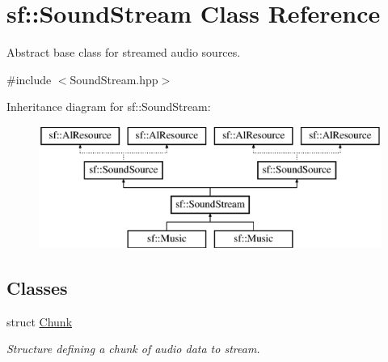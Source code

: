 \hypertarget{classsf_1_1_sound_stream}{\section{sf\-:\-:Sound\-Stream Class Reference}
\label{classsf_1_1_sound_stream}
}


Abstract base class for streamed audio sources.  




{\ttfamily \#include $<$Sound\-Stream.\-hpp$>$}

Inheritance diagram for sf\-:\-:Sound\-Stream\-:\begin{figure}[H]
\begin{center}
\leavevmode
\includegraphics[height=4.000000cm]{classsf_1_1_sound_stream}
\end{center}
\end{figure}
\subsection*{Classes}
\begin{DoxyCompactItemize}
\item 
struct \hyperlink{structsf_1_1_sound_stream_1_1_chunk}{Chunk}
\begin{DoxyCompactList}\small\item\em Structure defining a chunk of audio data to stream. \end{DoxyCompactList}\end{DoxyCompactItemize}
